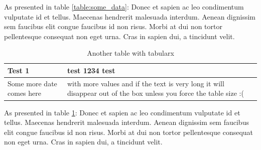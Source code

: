 \documentclass[11pt,a4paper,oneside,article]{memoir}
\begin{document}
As presented in table \ref{table:some_data}: Donec et sapien ac leo condimentum vulputate id et tellus. Maecenas hendrerit malesuada interdum. Aenean dignissim sem faucibus elit congue faucibus id non risus. Morbi at dui non tortor pellentesque consequat non eget urna. Cras in sapien dui, a tincidunt velit.

\begin{table}[h]
  \centering
  \caption{Another table with tabularx}
  \begin{tabularx}{.95\textwidth}{| l | >{\centering\arraybackslash} X |}
    \hline
    Test 1 & test 1234 test \\
    \hline
    Some more date comes here & with more values and if the text is very long it will disappear out of the box unless you force the table size :( \\
    \hline
  \end{tabularx}
  \label{table:some_data2}
\end{table}

As presented in table \ref{table:some_data2}: Donec et sapien ac leo condimentum vulputate id et tellus. Maecenas hendrerit malesuada interdum. Aenean dignissim sem faucibus elit congue faucibus id non risus. Morbi at dui non tortor pellentesque consequat non eget urna. Cras in sapien dui, a tincidunt velit.



\newpage

\begin{flushleft}
\begin{singlespacing}

\end{singlespacing}
\end{flushleft}

\label{LastPage}~
\end{document}
